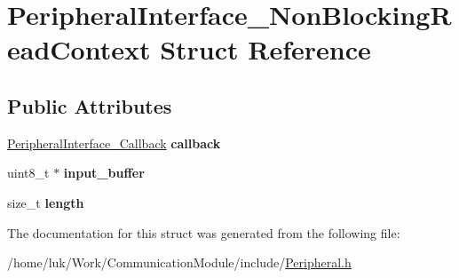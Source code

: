 \hypertarget{structPeripheralInterface__NonBlockingReadContext}{}\section{Peripheral\+Interface\+\_\+\+Non\+Blocking\+Read\+Context Struct Reference}
\label{structPeripheralInterface__NonBlockingReadContext}
\subsection*{Public Attributes}
\begin{DoxyCompactItemize}
\item 
\mbox{\label{structPeripheralInterface__NonBlockingReadContext_aace836b9f9f2850a4733d2bf092e1922}} 
\mbox{\hyperlink{structCommunicationModule__Callback}{Peripheral\+Interface\+\_\+\+Callback}} {\bfseries callback}
\item 
\mbox{\label{structPeripheralInterface__NonBlockingReadContext_a338b0ff4e93ded561166815ee8825dab}} 
uint8\+\_\+t $\ast$ {\bfseries input\+\_\+buffer}
\item 
\mbox{\label{structPeripheralInterface__NonBlockingReadContext_a9314e35bf121dcd80d34562352228a99}} 
size\+\_\+t {\bfseries length}
\end{DoxyCompactItemize}


The documentation for this struct was generated from the following file\+:\begin{DoxyCompactItemize}
\item 
/home/luk/\+Work/\+Communication\+Module/include/\mbox{\hyperlink{Peripheral_8h}{Peripheral.\+h}}\end{DoxyCompactItemize}
